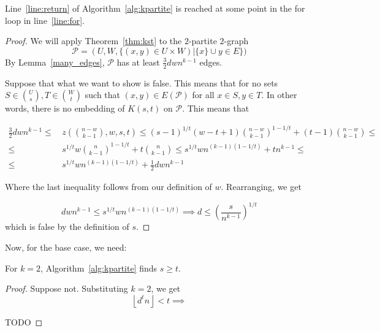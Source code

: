 \begin{lemma}
    Line~\ref{line:return} of Algorithm~\ref{alg:kpartite} is reached at some point in the for
    loop in line~\ref{line:for}.
    \begin{proof}
        We will apply Theorem~\ref{thm:kst} to the $2$-partite $2$-graph
        \[
            \mathcal{P} = (U, W, \{(x, y) \in U \times W) | \{x\} \cup y \in E \})
        \]
        By Lemma~\ref{many_edges}, $\mathcal{P}$ has at least
        $\frac{3}{2}dwn^{k-1}$ edges.

        Suppose that what we want to show is false.
        This means that for no sets $S \in \binom{U}{s}, T \in \binom{W}{t}$
        such that $(x, y) \in E (\mathcal{P})$ for all $x \in S, y \in T $.
        In other words, there is no embedding of $K(s, t)$ on $\mathcal{P}$.
        This means that


        \begin{align*}
            \frac{3}{2}dwn^{k-1} \leq &
            \, z \left(\binom{n - w}{k-1}, w, s, t  \right) \leq
            (s-1)^{1/t}(w-t+1)\binom{n-w}{k-1}^{1-1/t} + (t-1)\binom{n-w}{k-1} \leq \\
            \leq & \, s^{1/t} w \binom{n}{k-1}^{1-1/t} + t \binom{n}{k-1} \leq
             s^{1/t} wn^{(k-1)(1-1/t)} + tn^{k-1} \leq \\
            \leq & \, s^{1/t} wn^{(k-1)(1-1/t)} + \frac{1}{2} dwn^{k-1}
        \end{align*}

        Where the last inequality follows from our definition of $w$.
        Rearranging, we get

        \[
            dwn^{k-1} \leq s^{1/t} wn^{(k-1)(1-1/t)} \implies d \leq \left(\frac{s}{n^{k-1}}\right)^{1/t}
        \]
        which is false by the definition of $s$.
    \end{proof}
\end{lemma}

Now, for the base case, we need:

\begin{lemma}
    For $k=2$, Algorithm~\ref{alg:kpartite} finds $s \geq t$.
    \begin{proof}
        Suppose not.
        Substituting $k=2$, we get
        \[
            \left\lfloor d^t n  \right\rfloor < t \implies
        \]

        TODO %
    \end{proof}
\end{lemma}

